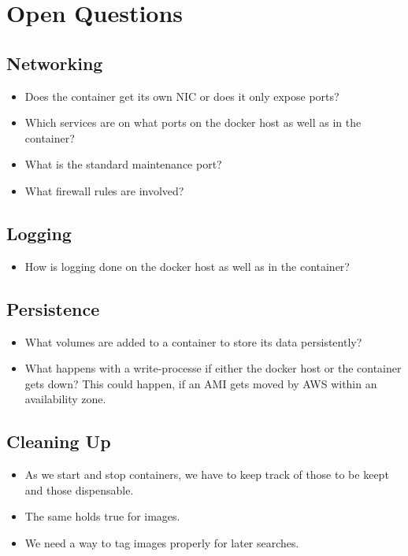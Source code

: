 \documentclass[captions=tableheading]{article}
\begin{document}
\section{Open Questions}
\label{sec-10}
\subsection{Networking}
\label{sec-10-1}

\begin{itemize}
\item Does the container get its own NIC or does it only expose ports?
\item Which services are on what ports on the docker host as well as in the container?
\item What is the standard maintenance port?
\item What firewall rules are involved?
\end{itemize}
\subsection{Logging}
\label{sec-10-2}

\begin{itemize}
\item How is logging done on the docker host as well as in the container?
\end{itemize}
\subsection{Persistence}
\label{sec-10-3}

\begin{itemize}
\item What volumes are added to a container to store its data persistently?
\item What happens with a write-processe if either the docker host or the container gets down? This could happen, if an AMI gets moved by AWS within an availability zone.
\end{itemize}
\subsection{Cleaning Up}
\label{sec-10-4}

\begin{itemize}
\item As we start and stop containers, we have to keep track of those to be keept and those dispensable.
\item The same holds true for images.
\item We need a way to tag images properly for later searches.
\end{itemize}
\end{document}
